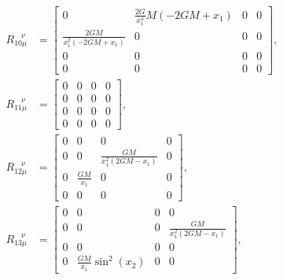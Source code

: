\documentclass[10pt,onecolumn,dvipdfmx]{article}
\begin{document}
\begin{align}
R_{10\mu }^{\ \ \ \ \nu } &=\left[\begin{matrix}0 & \frac{2 G}{x_{1}^{4}} M \left(- 2 G M + x_{1}\right) & 0 & 0\\\frac{2 G M}{x_{1}^{2} \left(- 2 G M + x_{1}\right)} & 0 & 0 & 0\\0 & 0 & 0 & 0\\0 & 0 & 0 & 0\end{matrix}\right], \\
R_{11\mu }^{\ \ \ \ \nu } &=\left[\begin{matrix}0 & 0 & 0 & 0\\0 & 0 & 0 & 0\\0 & 0 & 0 & 0\\0 & 0 & 0 & 0\end{matrix}\right], \\
R_{12\mu }^{\ \ \ \ \nu } &=\left[\begin{matrix}0 & 0 & 0 & 0\\0 & 0 & \frac{G M}{x_{1}^{2} \left(2 G M - x_{1}\right)} & 0\\0 & \frac{G M}{x_{1}} & 0 & 0\\0 & 0 & 0 & 0\end{matrix}\right], \\
R_{13\mu }^{\ \ \ \ \nu } &=\left[\begin{matrix}0 & 0 & 0 & 0\\0 & 0 & 0 & \frac{G M}{x_{1}^{2} \left(2 G M - x_{1}\right)}\\0 & 0 & 0 & 0\\0 & \frac{G M}{x_{1}} \sin^{2}{\left (x_{2} \right )} & 0 & 0\end{matrix}\right], 
\end{align}
\end{document}
